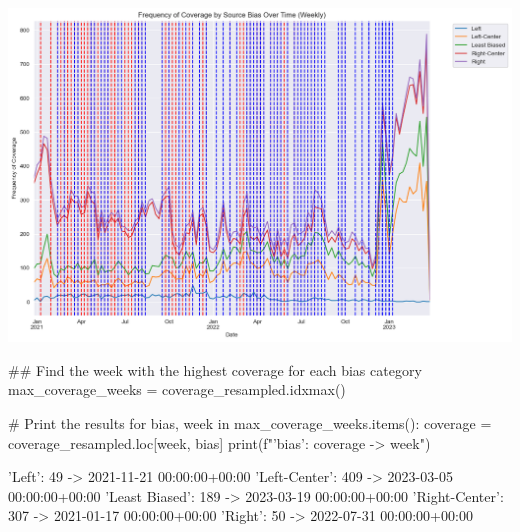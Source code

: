 \includegraphics[width=\textwidth]{./figs/fig_6.png}


\begin{pyin}
\## Find the week with the highest coverage for each bias category
max_coverage_weeks = coverage_resampled.idxmax()

# Print the results
for bias, week in max_coverage_weeks.items():
    coverage = coverage_resampled.loc[week, bias]
    print(f"'{bias}': {coverage} -> {week}")
\end{pyin}

\begin{pyprint}
'Left': 49 -> 2021-11-21 00:00:00+00:00
'Left-Center': 409 -> 2023-03-05 00:00:00+00:00
'Least Biased': 189 -> 2023-03-19 00:00:00+00:00
'Right-Center': 307 -> 2021-01-17 00:00:00+00:00
'Right': 50 -> 2022-07-31 00:00:00+00:00
\end{pyprint}



